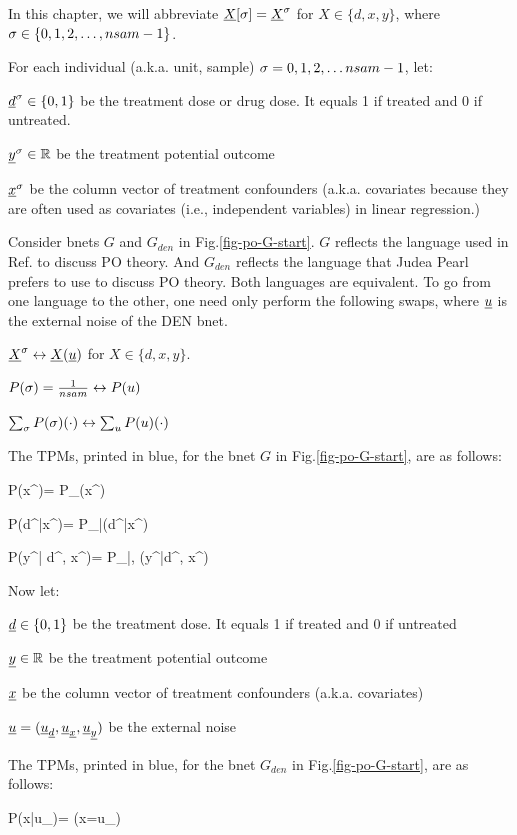 In this chapter, we will
abbreviate
$\rvX[\s]=\rvX^\s$
for
$X\in \{d, x, y\}$, where
 $\sigma\in\{0,1,2, \ldots, nsam-1\}$.


For each individual (a.k.a. unit, sample)
$\sigma=0, 1, 2, \ldots nsam-1$, let:

$\rvd^\s\in\bool$ be the
 treatment dose or drug dose.
It equals 1 if
treated
and 0 if untreated.

$\rvy^\s\in \RR$ be the
 treatment potential outcome

$\rvx^\s$ be the column vector of treatment
confounders
(a.k.a. covariates because they
are often used as covariates (i.e.,
independent
variables) in linear regression.)

Consider bnets $G$ and $G_{den}$
in
 Fig.\ref{fig-po-G-start}.
$G$ reflects the language
used in Ref.\cite{book-mixtape}
to discuss PO theory. And
$G_{den}$ reflects
the language that Judea Pearl
prefers to use to discuss PO theory.
Both languages are equivalent. To go from
one language to the other, one need only
perform the following
swaps, where $\rvu$
is the external noise of the DEN bnet.

$\rvX^\s\leftrightarrow \rvX(\rvu)$
for $X\in \{d, x, y\}$.

$P(\sigma)=\frac{1}{nsam}\leftrightarrow P(u)$

$\sum_\sigma P(\sigma) (\cdot)
\leftrightarrow \sum_uP(u) (\cdot)$




The TPMs, printed in blue,
for the bnet
$G$
in Fig.\ref{fig-po-G-start},
are as follows:


\beq\color{blue}
P(x^\s)=
P_{\rvx}(x^\s)
\eeq

\beq\color{blue}
P(d^\s|x^\s)=
P_{\rvd|\rvx}(d^\s|x^\s)
\eeq


\beq\color{blue}
P(y^\s| d^\s, x^\s)=
P_{\rvy|\rvd, \rvx}(y^\s|d^\s, x^\s)
\eeq




Now let:

$\rvd\in\bool$
be the treatment dose.
It equals
1 if treated and 0 if untreated

$\rvy\in \RR$ be the
 treatment potential outcome

$\rvx$ be the column vector of
treatment
confounders (a.k.a. covariates)


$\rvu=(\rvu_\rvd,
\rvu_\rvx, \rvu_\rvy)$ be the
external noise

The TPMs, printed in blue,
for the bnet
$G_{den}$
in Fig.\ref{fig-po-G-start},
are as follows:


\beq \color{blue}
P(x|u_\rvx)= \indi(\;\;x=u_\rvx\;\;)
\eeq

